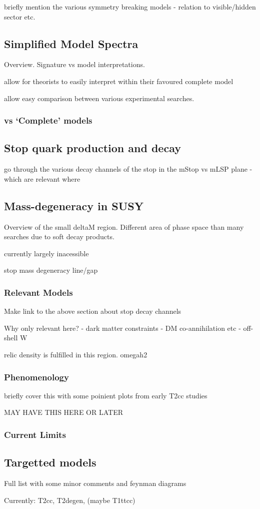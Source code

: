 briefly mention the various symmetry breaking models - relation to visible/hidden sector 
etc.


\subsection{Simplified Model Spectra}
Overview. Signature vs model interpretations.

allow for theorists to easily interpret within their favoured complete model

allow easy comparison between various experimental searches.

\subsubsection{vs `Complete' models}

\subsection{Stop quark production and decay}
go through the various decay channels of the stop in the mStop vs mLSP plane
- which are relevant where

\subsection{Mass-degeneracy in SUSY}
Overview of the small deltaM region. Different area of phase space than many searches due to soft decay 
products.

currently largely inacessible

stop mass degeneracy line/gap

\subsubsection{Relevant Models}
Make link to the above section about stop decay channels

Why only relevant here?
- dark matter constraints - DM co-annihilation etc
- off-shell W

relic density is fulfilled in this region. omegah2

\subsubsection{Phenomenology}
briefly cover this with some poinient plots from early T2cc studies

MAY HAVE THIS HERE OR LATER
\subsubsection{Current Limits}

\subsection{Targetted models}
Full list with some minor comments and feynman diagrams

Currently: T2cc, T2degen, (maybe T1ttcc)